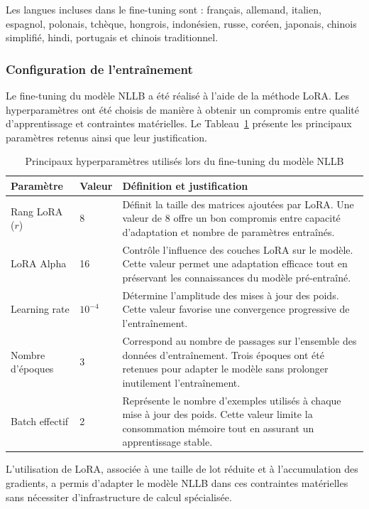 Les langues incluses dans le fine-tuning sont : français, allemand, italien, espagnol, polonais, tchèque, hongrois, indonésien, russe, coréen, japonais, chinois simplifié, hindi, portugais et chinois traditionnel.

\subsubsection{Configuration de l'entraînement}

Le fine-tuning du modèle NLLB a été réalisé à l'aide de la méthode LoRA. Les hyperparamètres ont été choisis de manière à obtenir un compromis entre qualité d'apprentissage et contraintes matérielles. Le Tableau~\ref{tab:hyperparametres_nllb} présente les principaux paramètres retenus ainsi que leur justification.

\begin{table}[H]
\centering
\caption{Principaux hyperparamètres utilisés lors du fine-tuning du modèle NLLB}
\label{tab:hyperparametres_nllb}
\begin{tabular}{|p{3cm}|p{1.5cm}|p{10cm}|}
\hline
\textbf{Paramètre} & \textbf{Valeur} & \textbf{Définition et justification} \\
\hline
Rang LoRA ($r$) & 8 & Définit la taille des matrices ajoutées par LoRA. Une valeur de 8 offre un bon compromis entre capacité d'adaptation et nombre de paramètres entraînés. \\
\hline
LoRA Alpha & 16 & Contrôle l'influence des couches LoRA sur le modèle. Cette valeur permet une adaptation efficace tout en préservant les connaissances du modèle pré-entraîné. \\
\hline
Learning rate & $10^{-4}$ & Détermine l'amplitude des mises à jour des poids. Cette valeur favorise une convergence progressive de l'entraînement. \\
\hline
Nombre d'époques & 3 & Correspond au nombre de passages sur l'ensemble des données d'entraînement. Trois époques ont été retenues pour adapter le modèle sans prolonger inutilement l'entraînement. \\
\hline
Batch effectif & 2 & Représente le nombre d'exemples utilisés à chaque mise à jour des poids. Cette valeur limite la consommation mémoire tout en assurant un apprentissage stable. \\
\hline
\end{tabular}
\end{table}

L'utilisation de LoRA, associée à une taille de lot réduite et à l'accumulation des gradients, a permis d'adapter le modèle NLLB dans ces contraintes matérielles sans nécessiter d'infrastructure de calcul spécialisée.

